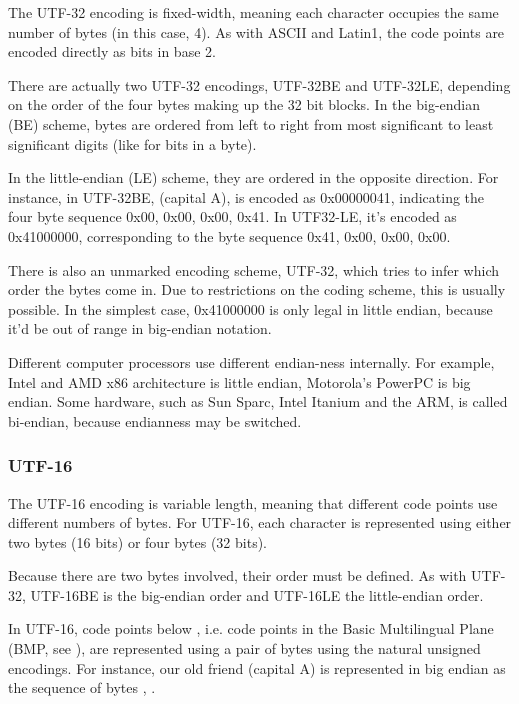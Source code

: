 The UTF-32 encoding is fixed-width, meaning each character occupies
the same number of bytes (in this case, 4).  As with ASCII and
Latin1, the code points are encoded directly as bits in base 2.

There are actually two UTF-32 encodings, UTF-32BE and UTF-32LE,
depending on the order of the four bytes making up the 32 bit blocks.
In the big-endian (BE) scheme, bytes are ordered from left to right
from most significant to least significant digits (like for bits in a
byte).  

In the little-endian (LE) scheme, they are ordered in the
opposite direction.  For instance, in UTF-32BE, 
(capital A), is encoded as 0x00000041, indicating the four byte
sequence 0x00, 0x00, 0x00, 0x41.  In UTF32-LE, it's encoded as
0x41000000, corresponding to the byte sequence 0x41, 0x00, 0x00, 0x00.

There is also an unmarked encoding scheme, UTF-32, which tries to
infer which order the bytes come in.  Due to restrictions on the
coding scheme, this is usually possible.  In the simplest case,
0x41000000 is only legal in little endian, because it'd be out of
range in big-endian notation.  

Different computer processors use different endian-ness
internally.  For example, Intel and AMD x86 architecture is little
endian, Motorola's PowerPC is big endian.  Some hardware, such
as Sun Sparc, Intel Itanium and the ARM, is called bi-endian, because
endianness may be switched.

\subsubsection{UTF-16}\label{section:utf-16}

The UTF-16 encoding is variable length, meaning that different code
points use different numbers of bytes.  For UTF-16, each character is
represented using either two bytes (16 bits) or four bytes (32 bits).

Because there are two bytes involved, their order must be defined.  As
with UTF-32, UTF-16BE is the big-endian order and UTF-16LE the
little-endian order.

In UTF-16, code points below , i.e. 
code points in the Basic Multilingual Plane (BMP, see ),
are represented using a pair of bytes using the natural
unsigned encodings.  For instance, our
old friend  (capital A) is represented in big endian as
the sequence of bytes , .

